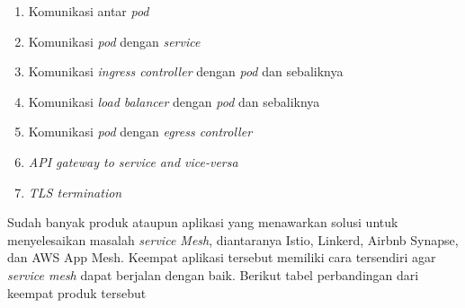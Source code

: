 \begin{enumerate}
  \item Komunikasi antar \textit{pod}
  \item Komunikasi \textit{pod} dengan \textit{service}
  \item Komunikasi \textit{ingress controller} dengan \textit{pod} dan sebaliknya
  \item Komunikasi \textit{load balancer} dengan \textit{pod} dan sebaliknya
  \item Komunikasi \textit{pod} dengan \textit{egress controller}
  \item \textit{API gateway to service and vice-versa}
  \item \textit{TLS termination}
\end{enumerate}

Sudah banyak produk ataupun aplikasi yang menawarkan solusi untuk menyelesaikan masalah \textit{\textit{service} Mesh}, diantaranya Istio, Linkerd, Airbnb Synapse, dan AWS App Mesh. Keempat aplikasi tersebut memiliki cara tersendiri agar \textit{\textit{service} mesh} dapat berjalan dengan baik. Berikut tabel perbandingan dari keempat produk tersebut

